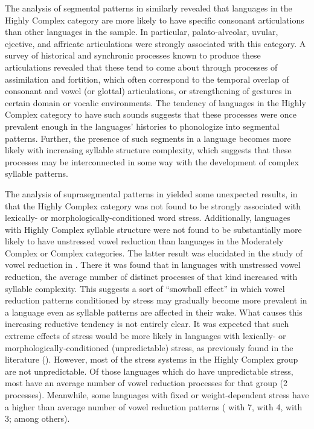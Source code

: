   The analysis of segmental patterns in  similarly revealed that languages in the Highly Complex category are more likely to have specific consonant articulations than other languages in the sample. In particular, palato-alveolar, uvular, ejective, and affricate articulations were strongly associated with this category. A survey of historical and synchronic processes known to produce these articulations revealed that these tend to come about through processes of assimilation and fortition, which often correspond to the temporal overlap of consonant and vowel (or glottal) articulations, or strengthening of gestures in certain domain or vocalic environments. The tendency of languages in the Highly Complex category to have such sounds suggests that these processes were once prevalent enough in the languages’ histories to phonologize into segmental patterns. Further, the presence of such segments in a language becomes more likely with increasing syllable structure complexity, which suggests that these processes may be interconnected in some way with the development of complex syllable patterns.

  The analysis of suprasegmental patterns in  yielded some unexpected results, in that the Highly Complex category was not found to be strongly associated with lexically- or morphologically-conditioned word stress. Additionally, languages with Highly Complex syllable structure were not found to be substantially more likely to have unstressed vowel reduction than languages in the Moderately Complex or Complex categories. The latter result was elucidated in the study of vowel reduction in . There it was found that in languages with unstressed vowel reduction, the average number of distinct processes of that kind increased with syllable complexity. This suggests a sort of ``snowball effect'' in which vowel reduction patterns conditioned by stress may gradually become more prevalent in a language even as syllable patterns are affected in their wake. What causes this increasing reductive tendency is not entirely clear. It was expected that such extreme effects of stress would be more likely in languages with lexically- or morphologically-conditioned (unpredictable) stress, as previously found in the literature (\citealt{BybeeEtAl1998,Schiering2007}). However, most of the stress systems in the Highly Complex group are not unpredictable. Of those languages which do have unpredictable stress, most have an average number of vowel reduction processes for that group (2 processes). Meanwhile, some languages with fixed or weight-dependent stress have a higher than average number of vowel reduction patterns ( with 7,  with 4,  with 3; among others). 

